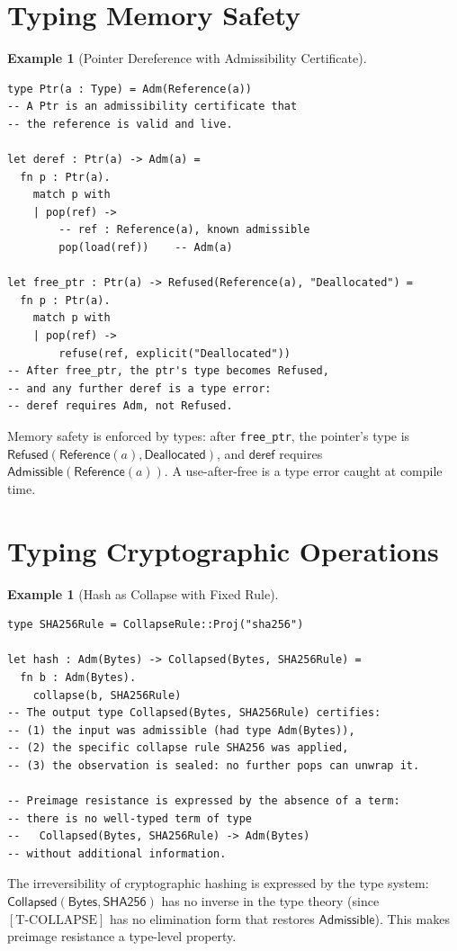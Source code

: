 \documentclass[12pt, a4paper, openany]{book}
\theoremstyle{plain}
\theoremstyle{definition}
\newtheorem{example}[theorem]{Example}
\theoremstyle{remark}
\newcommand{\Adm}{\mathsf{Admissible}}
\newcommand{\Rfsd}{\mathsf{Refused}}
\newcommand{\Col}{\mathsf{Collapsed}}
\begin{document}
\section{Typing Memory Safety}

\begin{example}[Pointer Dereference with Admissibility Certificate]
\begin{lstlisting}[style=rust, caption={Safe pointer dereference}]
type Ptr(a : Type) = Adm(Reference(a))
-- A Ptr is an admissibility certificate that
-- the reference is valid and live.

let deref : Ptr(a) -> Adm(a) =
  fn p : Ptr(a).
    match p with
    | pop(ref) ->
        -- ref : Reference(a), known admissible
        pop(load(ref))    -- Adm(a)

let free_ptr : Ptr(a) -> Refused(Reference(a), "Deallocated") =
  fn p : Ptr(a).
    match p with
    | pop(ref) ->
        refuse(ref, explicit("Deallocated"))
-- After free_ptr, the ptr's type becomes Refused,
-- and any further deref is a type error:
-- deref requires Adm, not Refused.
\end{lstlisting}
Memory safety is enforced by types: after \texttt{free\_ptr}, the pointer's
type is $\Rfsd(\mathsf{Reference}(a), \mathsf{Deallocated})$, and
$\mathsf{deref}$ requires $\Adm(\mathsf{Reference}(a))$. A use-after-free is
a type error caught at compile time.
\end{example}

\section{Typing Cryptographic Operations}

\begin{example}[Hash as Collapse with Fixed Rule]
\begin{lstlisting}[style=rust, caption={Cryptographic hash as collapse}]
type SHA256Rule = CollapseRule::Proj("sha256")

let hash : Adm(Bytes) -> Collapsed(Bytes, SHA256Rule) =
  fn b : Adm(Bytes).
    collapse(b, SHA256Rule)
-- The output type Collapsed(Bytes, SHA256Rule) certifies:
-- (1) the input was admissible (had type Adm(Bytes)),
-- (2) the specific collapse rule SHA256 was applied,
-- (3) the observation is sealed: no further pops can unwrap it.

-- Preimage resistance is expressed by the absence of a term:
-- there is no well-typed term of type
--   Collapsed(Bytes, SHA256Rule) -> Adm(Bytes)
-- without additional information.
\end{lstlisting}
The irreversibility of cryptographic hashing is expressed by the type system:
$\Col(\mathsf{Bytes}, \mathsf{SHA256})$ has no inverse in the type theory
(since $[\mathrm{T\text{-}COLLAPSE}]$ has no elimination form that restores
$\Adm$). This makes preimage resistance a type-level property.
\end{example}
\end{document}
